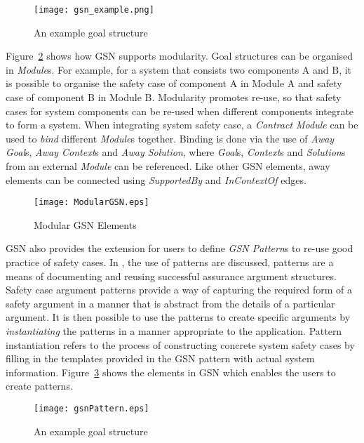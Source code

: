 \begin{figure}
	\centering
	\texttt{[image: gsn\_example.png]}
	\caption{An example goal structure}
	\label{fig:goalStructure}
\end{figure}
Figure~\ref{fig:modularGSN} shows how GSN supports modularity. Goal structures can be organised in \textit{Module}s. For example, for a system that consists two components A and B, it is possible to organise the safety case of component A in Module A and safety case of component B in Module B. Modularity promotes re-use, so that safety cases for system components can be re-used when different components integrate to form a system. When integrating system safety case, a \textit{Contract Module} can be used to \textit{bind} different \textit{Module}s together. Binding is done via the use of \textit{Away Goal}s, \textit{Away Context}s and \textit{Away Solution}, where \textit{Goal}s, \textit{Context}s and \textit{Solution}s from an external \textit{Module} can be referenced. Like other GSN elements, away elements can be connected using \textit{SupportedBy} and \textit{InContextOf} edges.

\begin{figure}
	\centering
	\texttt{[image: ModularGSN.eps]}
	\caption{Modular GSN Elements}
	\label{fig:modularGSN}
\end{figure}

GSN also provides the extension for users to define \textit{GSN Pattern}s to re-use good practice of safety cases. In \cite{kelly1997safety}, the use of patterns are discussed, patterns are a means of documenting and reusing successful assurance argument structures. Safety case argument patterns provide a way of capturing the required form of a safety argument in a manner that is abstract from the details of a particular argument. It is then possible to use the patterns to create specific arguments by \textit{instantiating} the patterns in a manner appropriate to the application. Pattern instantiation refers to the process of constructing concrete system safety cases by filling in the templates provided in the GSN pattern with actual system information. Figure~\ref{fig:gsnPatterns} shows the elements in GSN which enables the users to create patterns.

\begin{figure}
	\centering
	\texttt{[image: gsnPattern.eps]}
	\caption{An example goal structure}
	\label{fig:gsnPatterns}
\end{figure}

